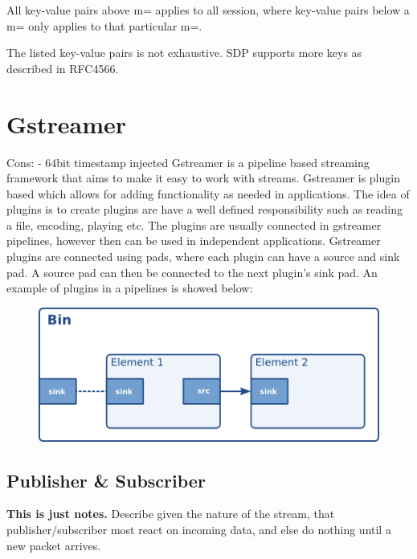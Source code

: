 All key-value pairs above m= applies to all session, where key-value pairs below a m= only applies to that particular m=.

The listed key-value pairs is not exhaustive. SDP supports more keys as described in RFC4566.


\section{Gstreamer}
Cons:
 - 64bit timestamp injected
Gstreamer is a pipeline based streaming framework that aims to make it easy to work with streams. Gstreamer is plugin based which allows for adding functionality as needed in applications. The idea of plugins is to create plugins are have a well defined responsibility such as reading a file, encoding, playing etc. The plugins are usually connected in gstreamer pipelines, however then can be used in independent applications. Gstreamer plugins are connected using pads, where each plugin can have a source and sink pad. A source pad can then be connected to the next plugin's sink pad. An example of plugins in a pipelines is showed below:
\begin{figure}
	\includegraphics[width=1\textwidth]{figures/bin-element-ghost.png}
\end{figure}









\subsection{Publisher \& Subscriber}
\textbf{This is just notes.}
Describe given the nature of the stream, that publisher/subscriber most react on incoming data, and else do nothing until a new packet arrives.

